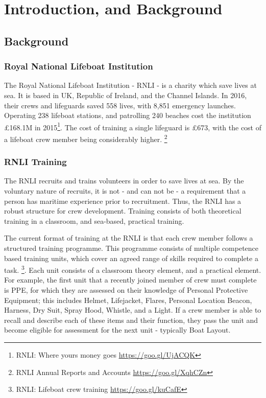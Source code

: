 \documentclass[ %
                    author={Elis Jones},
                supervisor={Dr. Kirsten Cater},
                    degree={BSc},
                     title={The Effect of Presentation Medium on Spatial Cognition},
                  subtitle={in the Virtual Environment},
                      year={2018} ]{dissertation}
\begin{document}
\mainmatter
\chapter{Introduction, and Background}\label{intro_chapter}
\section{Background}
\subsection{Royal National Lifeboat Institution}\label{rnli-money}
The Royal National Lifeboat Institution - RNLI - is a charity which save lives at sea. It is based in UK, Republic of Ireland, and the Channel Islands. In 2016, their crews and lifeguards saved 558 lives, with 8,851 emergency launches. Operating 238 lifeboat stations, and patrolling 240 beaches cost the institution £168.1M in 2015\footnote{RNLI: Where yours money goes \url{https://goo.gl/UjACQK}}. The cost of training a single lifeguard is £673, with the cost of a lifeboat crew member being considerably higher. \footnote{ RNLI Annual Reports and Accounts \url{https://goo.gl/XqhCZn}} 



\subsection{RNLI Training} \label{rnli_training}
The RNLI recruits and trains volunteers in order to save lives at sea. By the voluntary nature of recruits, it is not - and can not be - a requirement that a person has maritime experience prior to recruitment. Thus, the RNLI has a robust structure for crew development. Training consists of both theoretical training in a classroom, and sea-based, practical training.

The current format of training at the RNLI is that each crew member follows a structured training programme. This programme consists of multiple competence based training units, which cover an agreed range of skills required to complete a task. \footnote{RNLI: Lifeboat crew training \url{https://goo.gl/kuCafE}}. Each unit consists of a classroom theory element, and a practical element. For example, the first unit that a recently joined member of crew must complete is PPE, for which they are assessed on their knowledge of Personal Protective Equipment; this includes Helmet, Lifejacket, Flares, Personal Location Beacon, Harness, Dry Suit, Spray Hood, Whistle, and a Light. If a crew member is able to recall and describe each of these items and their function, they pass the unit and become eligible for assessment for the next unit - typically Boat Layout. 
\end{document}
